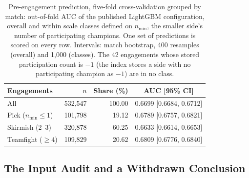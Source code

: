 \begin{table}[t]
\centering
\caption{Pre-engagement prediction, five-fold cross-validation grouped by match: out-of-fold AUC of the
published LightGBM configuration, overall and within scale classes defined on $n_{\min}$, the smaller
side's number of participating champions. One
set of predictions is scored on every row. Intervals: match bootstrap, 400 resamples (overall) and 1,000
(classes). The 42 engagements whose stored participation count is $-1$ (the index stores a side with no
participating champion as $-1$) are in no class.}
\label{tab:pred-headline}
\footnotesize
\setlength{\tabcolsep}{4pt}
\begin{tabular}{@{}lrrc@{}}
\toprule
Engagements & $n$ & Share (\%) & AUC [95\% CI] \\
\midrule
All & 532,547 & 100.00 & 0.6699 [0.6684, 0.6712] \\
Pick ($n_{\min} \le 1$) & 101,798 & 19.12 & 0.6789 [0.6757, 0.6821] \\
Skirmish ($2$--$3$) & 320,878 & 60.25 & 0.6633 [0.6614, 0.6653] \\
Teamfight ($\ge 4$) & 109,829 & 20.62 & 0.6809 [0.6776, 0.6840] \\
\bottomrule
\end{tabular}
\end{table}

\subsection{The Input Audit and a Withdrawn Conclusion}\label{sec:pred-audit}

